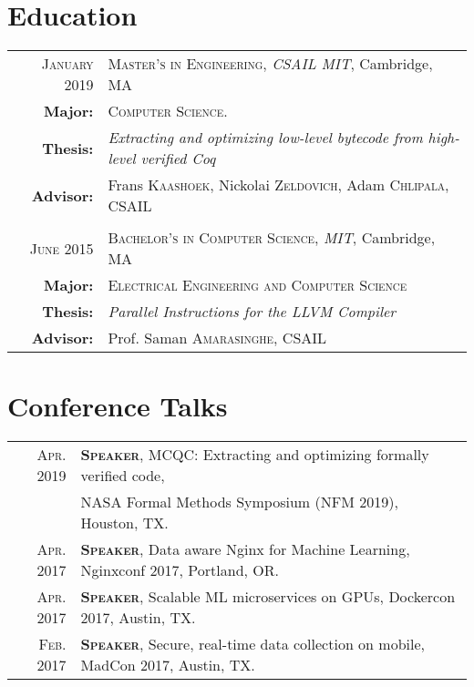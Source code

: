 \documentclass[lettersize,11pt]{article}
\begin{document}
\section{Education}
\begin{tabular}{rl}

\textsc{January} 2019 & \textsc{Master's in Engineering}, \emph{CSAIL MIT}, Cambridge, MA\\
\textbf{Major:} & \textsc{Computer Science.}\\
\textbf{Thesis:} & \emph{Extracting and optimizing low-level bytecode from high-level verified Coq}\\
\textbf{Advisor:} & Frans \textsc{Kaashoek}, Nickolai \textsc{Zeldovich}, Adam \textsc{Chlipala},  CSAIL\\
 & \\
\textsc{June} 2015 & \textsc{Bachelor's in Computer Science}, \emph{MIT}, Cambridge, MA\\
\textbf{Major:} & \textsc{Electrical Engineering and Computer Science}\\
\textbf{Thesis:} & \emph{Parallel Instructions for the LLVM Compiler}\\
\textbf{Advisor:} & Prof. Saman \textsc{Amarasinghe}, CSAIL\\
\end{tabular}

\section{Conference Talks}
\begin{tabular}{rl}
    \textsc{Apr.} 2019 & \textsc{\textbf{Speaker}}, MCQC: Extracting and optimizing formally verified code, \\
     &                                              NASA Formal Methods Symposium (NFM 2019), Houston, TX. \\
    \textsc{Apr.} 2017 & \textsc{\textbf{Speaker}}, Data aware Nginx for Machine Learning, Nginxconf 2017, Portland, OR. \\
    \textsc{Apr.} 2017 & \textsc{\textbf{Speaker}}, Scalable ML microservices on GPUs, Dockercon 2017, Austin, TX. \\
    \textsc{Feb.} 2017 & \textsc{\textbf{Speaker}}, Secure, real-time data collection on mobile, MadCon 2017, Austin, TX. \\
\end{tabular}
\end{document}
